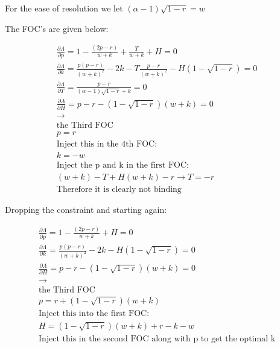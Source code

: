 \documentclass{article}
\begin{document}
For the ease of resolution we let $(\alpha-1) 
\sqrt{ 1-r } = w$

The FOC's are given below:

\begin{align*}
\frac{\partial \Lambda}{\partial p} = 
1-\frac{ (2p-r)}{w+k} + \frac{T}{w+k} + H  
=0 \\
\frac{\partial \Lambda}{\partial k} = \frac{ p(p-r)}{(w+k)^2} -2k
-T\frac{ p-r}{(w+k)^2}
-H(1-\sqrt{1-r})
=0\\
\frac{\partial \Lambda}{\partial T}=\frac{p-r}{(\alpha-1)\sqrt{1-r}+k}
= 0 \\
\frac{\partial \Lambda}{\partial H}=
p-r-(1-\sqrt{1-r})\left(w +k \right)
= 0 \\
\rightarrow \\
\text{the Third FOC} \\
p=r \\
\text{Inject this in the 4th FOC}: \\
k = -w \\
\text{Inject the p and k in the first FOC}: \\
(w+k)-T+H(w+k) -r 
\rightarrow 
T=-r \\
\text{Therefore it is clearly not binding}
\end{align*}

Dropping the constraint and starting again: 

\begin{align*}
\frac{\partial \Lambda}{\partial p} = 
1-\frac{ (2p-r)}{w+k} + H  
=0 \\
\frac{\partial \Lambda}{\partial k} = \frac{ p(p-r)}{(w+k)^2} -2k
-H(1-\sqrt{1-r})
=0\\
\frac{\partial \Lambda}{\partial H}=
p-r-(1-\sqrt{1-r})\left(w +k \right)
= 0 \\
\rightarrow \\
\text{the Third FOC} \\
p=r+(1-\sqrt{1-r})(w+k) \\
\text{Inject this into the first FOC}: \\
H = (1-\sqrt{1-r})(w+k) + r-k-w \\
\text{Inject this in the second FOC along with p to get the optimal k} 
\end{align*}
\end{document}
